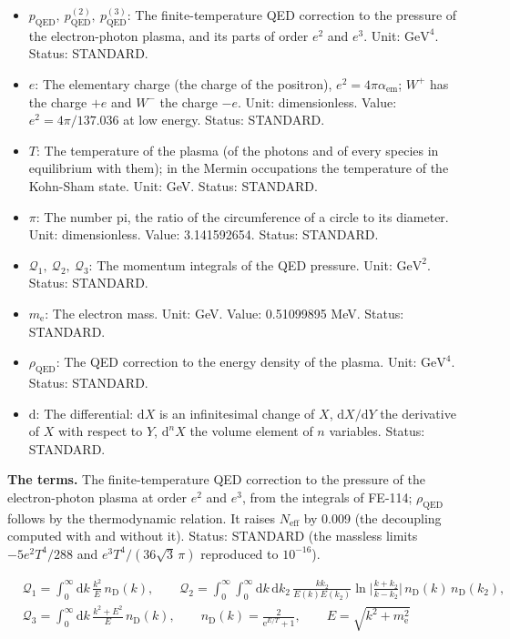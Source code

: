 \documentclass[
  10pt,
]{article}
\providecommand{\tightlist}{%
  \setlength{\itemsep}{0pt}\setlength{\parskip}{0pt}}
\begin{document}
\begin{itemize}
\tightlist
\item
  \(p_{\mathrm{QED}},\ p_{\mathrm{QED}}^{(2)},\ p_{\mathrm{QED}}^{(3)}\):
  The finite-temperature QED correction to the pressure of the
  electron-photon plasma, and its parts of order \(e^2\) and \(e^3\).
  Unit: \(\mathrm{GeV}^{4}\). Status: STANDARD.
\item
  \(e\): The elementary charge (the charge of the positron),
  \(e^2 = 4\pi\alpha_{\mathrm{em}}\); \(W^+\) has the charge \(+e\) and
  \(W^-\) the charge \(-e\). Unit: dimensionless. Value:
  \(e^2 = 4\pi/137.036\) at low energy. Status: STANDARD.
\item
  \(T\): The temperature of the plasma (of the photons and of every
  species in equilibrium with them); in the Mermin occupations the
  temperature of the Kohn-Sham state. Unit: GeV. Status: STANDARD.
\item
  \(\pi\): The number pi, the ratio of the circumference of a circle to
  its diameter. Unit: dimensionless. Value: 3.141592654. Status:
  STANDARD.
\item
  \(\mathcal{Q}_1,\ \mathcal{Q}_2,\ \mathcal{Q}_3\): The momentum
  integrals of the QED pressure. Unit: \(\mathrm{GeV}^{2}\). Status:
  STANDARD.
\item
  \(m_{\mathrm{e}}\): The electron mass. Unit: GeV. Value: 0.51099895
  MeV. Status: STANDARD.
\item
  \(\rho_{\mathrm{QED}}\): The QED correction to the energy density of
  the plasma. Unit: \(\mathrm{GeV}^{4}\). Status: STANDARD.
\item
  \(\mathrm{d}\): The differential: \(\mathrm{d}X\) is an infinitesimal
  change of \(X\), \(\mathrm{d}X/\mathrm{d}Y\) the derivative of \(X\)
  with respect to \(Y\), \(\mathrm{d}^nX\) the volume element of \(n\)
  variables. Status: STANDARD.
\end{itemize}

\textbf{The terms.} The finite-temperature QED correction to the
pressure of the electron-photon plasma at order \(e^2\) and \(e^3\),
from the integrals of FE-114; \(\rho_{\mathrm{QED}}\) follows by the
thermodynamic relation. It raises \(N_{\mathrm{eff}}\) by 0.009 (the
decoupling computed with and without it). Status: STANDARD (the massless
limits \(-5e^2T^4/288\) and \(e^3T^4/(36\sqrt3\,\pi)\) reproduced to
\(10^{-16}\)).

\[
\begin{aligned}
&\mathcal{Q}_1 = \int_0^\infty\mathrm{d}k\,\frac{k^2}{E}\,n_{\mathrm{D}}(k),\qquad
 \mathcal{Q}_2 = \int_0^\infty\!\!\int_0^\infty\mathrm{d}k\,\mathrm{d}k_2\,\frac{kk_2}{E(k)E(k_2)}
 \ln\Big\lvert\frac{k + k_2}{k - k_2}\Big\rvert\,n_{\mathrm{D}}(k)\,n_{\mathrm{D}}(k_2),\\
&\mathcal{Q}_3 = \int_0^\infty\mathrm{d}k\,\frac{k^2 + E^2}{E}\,n_{\mathrm{D}}(k),\qquad
 n_{\mathrm{D}}(k) = \frac{2}{\mathrm{e}^{E/T} + 1},\qquad E = \sqrt{k^2 + m_{\mathrm{e}}^2}
\end{aligned} \tag{FE-114}
\]
\end{document}
